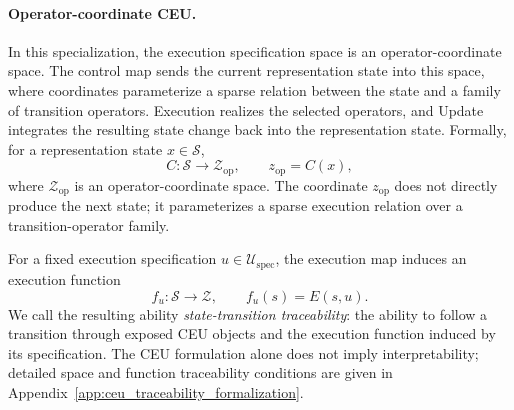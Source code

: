 \documentclass{article}
\begin{document}
\paragraph{Operator-coordinate CEU.}
In this specialization, the execution specification space is an operator-coordinate space. The control map sends the current representation state into this space, where coordinates parameterize a sparse relation between the state and a family of transition operators. Execution realizes the selected operators, and Update integrates the resulting state change back into the representation state.
Formally, for a representation state $x\in\mathcal{S}$,
\begin{equation}
    C:\mathcal{S}\to\mathcal{Z}_{\mathrm{op}},\qquad
    z_{\mathrm{op}}=C(x),
    \label{eq:intro_operator_coordinate_control}
\end{equation}
where $\mathcal{Z}_{\mathrm{op}}$ is an operator-coordinate space. The coordinate $z_{\mathrm{op}}$ does not directly produce the next state; it parameterizes a sparse execution relation over a transition-operator family.

For a fixed execution specification $u\in\mathcal{U}_{\mathrm{spec}}$, the execution map induces an execution function
\begin{equation}
    f_u:\mathcal{S}\to\mathcal{Z},\qquad f_u(s)=E(s,u).
    \label{eq:intro_induced_execution_function}
\end{equation}
We call the resulting ability \emph{state-transition traceability}: the ability to follow a transition through exposed CEU objects and the execution function induced by its specification. The CEU formulation alone does not imply interpretability; detailed space and function traceability conditions are given in Appendix~\ref{app:ceu_traceability_formalization}.
\end{document}
